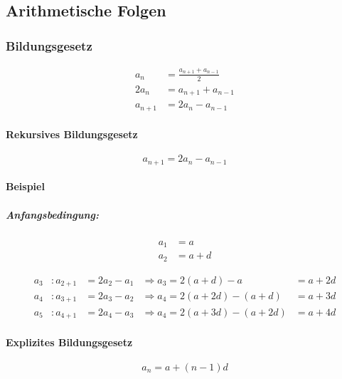 \subsection{Arithmetische Folgen}

\subsubsection{Bildungsgesetz}

\begin{align*}
	a_n     & = \frac{a_{n+1} + a_{n-1}}{2} \\
	2 a_n   & = a_{n+1} + a_{n-1}           \\
	a_{n+1} & = 2 a_n - a_{n-1}             
\end{align*}

\begin{gesetz}
	\paragraph{Rekursives Bildungsgesetz}
	
	\[
		a_{n+1} = 2 a_n - a_{n-1}
	\]
\end{gesetz}

\paragraph{Beispiel}

\subparagraph{Anfangsbedingung:}

\begin{align*}
	a_1 & = a     \\
	a_2 & = a + d 
\end{align*}

\[
	\begin{alignedat}{4}
		a_3 & : a_{2+1} & = 2a_2 - a_1 & \Rightarrow a_3 = 2(a+d) - a       & = a + 2d \\
		a_4 & : a_{3+1} & = 2a_3 - a_2 & \Rightarrow a_4 = 2(a+2d) - (a+d)  & = a + 3d \\
		a_5 & : a_{4+1} & = 2a_4 - a_3 & \Rightarrow a_4 = 2(a+3d) - (a+2d) & = a + 4d 
	\end{alignedat}
\]


\begin{gesetz}
	\paragraph{Explizites Bildungsgesetz}
	
	\[
		a_n = a + (n - 1)d
	\]
\end{gesetz}

